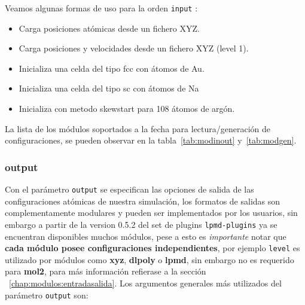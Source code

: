 Veamos algunas formas de uso para la orden \verb|input| :

\begin{itemize}
\item Carga posiciones at\'omicas desde un fichero XYZ.
\item Carga posiciones y velocidades desde un fichero XYZ (level 1).
\item Inicializa una celda del tipo fcc con átomos de Au.
\item Inicializa una celda del tipo sc con átomos de Na
\item Inicializa con metodo skewstart para 108 \'atomos de arg\'on.
\end{itemize}

La lista de los m\'odulos soportados a la fecha para lectura/generaci\'on de configuraciones, se pueden observar en la tabla~\ref{tab:modinout} y~\ref{tab:modgen}.

\subsubsection{output}

Con el par\'ametro \verb|output| se especifican las opciones de salida de las configuraciones at\'omicas de nuestra simulaci\'on, los formatos de salidas son complementamente modulares y pueden ser implementados por los usuarios, sin embargo a partir de la version 0.5.2 del set de plugins \verb|lpmd-plugins| ya se encuentran disponibles muchos m\'odulos, pese a esto es \textit{importante} notar que \textbf{cada m\'odulo posee configuraciones independientes}, por ejemplo \verb|level| es utilizado por m\'odulos como \textbf{xyz}, \textbf{dlpoly} o \textbf{lpmd}, sin embargo no es requerido para \textbf{mol2}, para m\'as informaci\'on refierase a la secci\'on ~\ref{chap:modulos:entradasalida}. Los argumentos generales m\'as utilizados del par\'ametro \verb|output| son:


